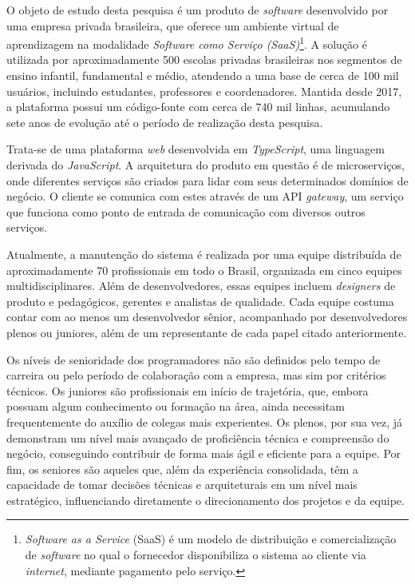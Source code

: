 O objeto de estudo desta pesquisa é um produto de \textit{software} desenvolvido por uma empresa privada brasileira, que oferece um ambiente virtual de aprendizagem na modalidade \textit{Software como Serviço (SaaS)}\footnote{\textit{Software as a Service} (SaaS) é um modelo de distribuição e comercialização de \textit{software} no qual o fornecedor disponibiliza o sistema ao cliente via \textit{internet}, mediante pagamento pelo serviço.}. A solução é utilizada por aproximadamente 500 escolas privadas brasileiras nos segmentos de ensino infantil, fundamental e médio, atendendo a uma base de cerca de 100 mil usuários, incluindo estudantes, professores e coordenadores. Mantida desde 2017, a plataforma possui um código-fonte com cerca de 740 mil linhas, acumulando sete anos de evolução até o período de realização desta pesquisa.

Trata-se de uma plataforma \textit{web} desenvolvida em \textit{TypeScript}, uma linguagem derivada do \textit{JavaScript}. A arquitetura do produto em questão é de microserviços, onde diferentes serviços são criados para lidar com seus determinados domínios de negócio. O cliente se comunica com estes através de um API \textit{gateway}, um serviço que funciona como ponto de entrada de comunicação com diversos outros serviços.

Atualmente, a manutenção do sistema é realizada por uma equipe distribuída de aproximadamente 70 profissionais em todo o Brasil, organizada em cinco equipes multidisciplinares. Além de desenvolvedores, essas equipes incluem \textit{designers} de produto e pedagógicos, gerentes e analistas de qualidade. Cada equipe costuma contar com ao menos um desenvolvedor sênior, acompanhado por desenvolvedores plenos ou juniores, além de um representante de cada papel citado anteriormente.

Os níveis de senioridade dos programadores não são definidos pelo tempo de carreira ou pelo período de colaboração com a empresa, mas sim por critérios técnicos. Os juniores são profissionais em início de trajetória, que, embora possuam algum conhecimento ou formação na área, ainda necessitam frequentemente do auxílio de colegas mais experientes. Os plenos, por sua vez, já demonstram um nível mais avançado de proficiência técnica e compreensão do negócio, conseguindo contribuir de forma mais ágil e eficiente para a equipe. Por fim, os seniores são aqueles que, além da experiência consolidada, têm a capacidade de tomar decisões técnicas e arquiteturais em um nível mais estratégico, influenciando diretamente o direcionamento dos projetos e da equipe.

